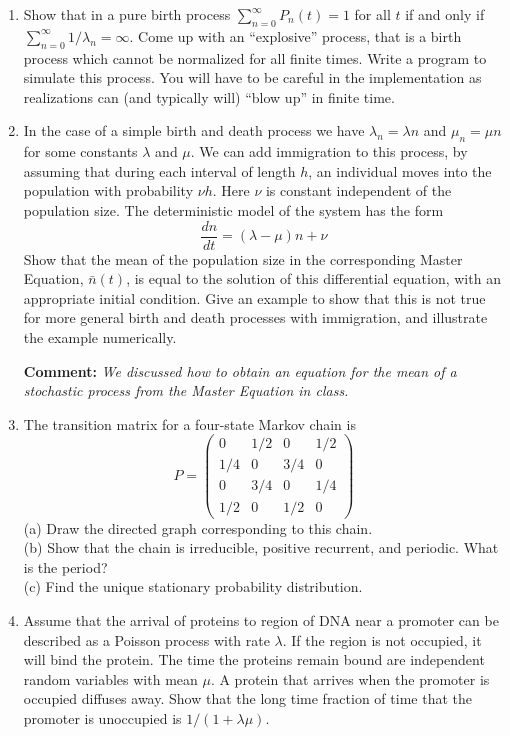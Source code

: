 \documentclass[12pt]{article}
\begin{document}
\begin{enumerate}

\item Show that in a pure birth process $\sum_{n = 0}^{\infty} P_n(t) = 1$ for all $t$ if and only 
if $\sum_{n = 0}^{\infty} 1/\lambda_n = \infty$.  Come up with an ``explosive'' process, that is a 
birth process which cannot be normalized for all finite times.   Write a program to simulate this 
process.   You will have to be careful in the implementation
as realizations can (and typically will) ``blow up'' in finite time.


\item In the case of a simple birth and death  process  we have $\lambda_n = \lambda n$ and $\mu_n = \mu n$ for
some constants $\lambda$ and $\mu$.   We can add immigration to this process, by assuming that
during each interval of length $h$, an individual  moves into the population with probability
$\nu h$.  Here $\nu$ is constant independent of the population size.  The deterministic model of the system
has the form
$$ 
\frac{dn}{dt} = (\lambda - \mu)n + \nu
$$
Show that the mean of the population size in the corresponding Master Equation, $\bar n(t)$, is equal to the solution 
of this differential equation, with an appropriate initial condition.    Give an example to show that
this is not true for more general birth and death processes with immigration, and illustrate the 
example numerically.

{\bf Comment:} \emph{We discussed how to obtain an equation for the mean of a stochastic process from
the Master Equation in class.}

\item The transition matrix for a four-state Markov chain is
$$
P=\begin{pmatrix}
0 & 1/2 & 0 & 1/2\\
1/4 & 0 & 3/4 & 0\\
0 & 3/4 & 0 & 1/4\\
1/2 & 0 & 1/2 & 0
\end{pmatrix}
$$
(a) Draw the directed graph corresponding to this chain.\\
(b) Show that the chain is irreducible, positive recurrent, and periodic.
What is the period?\\
(c) Find the unique stationary probability distribution.

\item Assume that the arrival of proteins to region of DNA near a promoter can be described as a Poisson process with 
rate $\lambda$.  If the region is not occupied, it will bind the protein. The time the proteins remain bound
are independent random variables with mean $\mu$. A protein that arrives when the promoter is 
occupied diffuses away.  Show that the long time fraction of time that the promoter is unoccupied is 
$1/(1 + \lambda \mu)$.


\end{enumerate}
\end{document}
